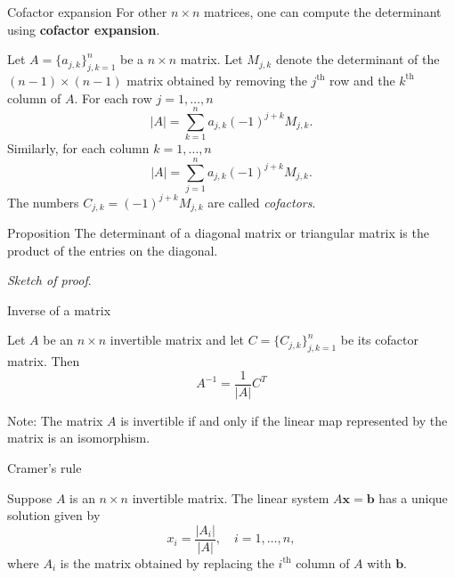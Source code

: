 \documentclass [aspectratio=169]{beamer}
\newcommand{\bx}{{\mathbf{x}}}
\newcommand{\inv}{{-1}}
\begin{document}
\begin{frame}{Cofactor expansion}
For other $n \times n$ matrices, one can compute the determinant using \textbf{\textcolor{deptoran}{cofactor expansion}}.

\begin{definition}
Let $A = \{ a_{j,k}\}_{j,k=1}^n$ be a $n\times n$ matrix. Let $M_{j,k}$ denote the determinant of the $(n-1) \times (n-1)$ matrix obtained by removing the $j^\text{th}$ row and the $k^\text{th}$ column of $A$. For each row $j=1,\ldots,n$
\begin{equation*}
    |A| = \sum_{k=1}^n a_{j,k} (-1)^{j+k} M_{j,k}.
\end{equation*}
Similarly, for each column $k=1,\ldots,n$
\begin{equation*}
    |A| = \sum_{j=1}^n a_{j,k} (-1)^{j+k} M_{j,k}.
\end{equation*}
The numbers $C_{j,k}=(-1)^{j+k} M_{j,k}$ are called \emph{cofactors}.
\end{definition}
\end{frame}


\begin{frame}
\begin{exampleblock}{Proposition}
The determinant of a diagonal matrix or triangular matrix is the product of the entries on the diagonal.
\end{exampleblock}
\textit{Sketch of proof}.
\vspace{4cm}


\end{frame}


\begin{frame}{Inverse of a matrix}
\begin{theorem}
Let $A$ be an $n \times n$ invertible matrix and let $C=\{C_{j,k}\}_{j,k=1}^n$ be its cofactor matrix. Then
\begin{equation*}
    A^\inv = \frac{1}{|A|} C^T
\end{equation*}
\end{theorem}

\vspace{1em}

Note: The matrix $A$ is invertible if and only if the linear map represented by the matrix is an isomorphism.
\end{frame}

\begin{frame}{Cramer's rule}
\begin{corollary}
Suppose $A$ is an $n \times n$ invertible matrix. The linear system $A\bx = \mathbf{b}$ has a unique solution given by
\begin{equation*}
    x_i = \frac{|A_i|}{|A|}, \quad i = 1, \ldots, n,
\end{equation*}
where $A_i$ is the matrix obtained by replacing the $i^\text{th}$ column of $A$ with $\mathbf{b}$.
\end{corollary}
\end{frame}
\end{document}
